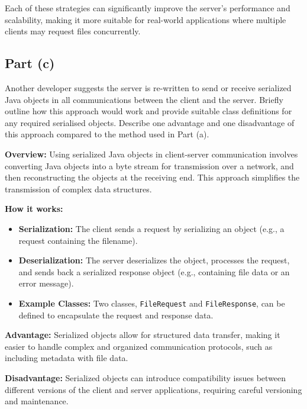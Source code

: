 \documentclass[12pt]{article}
\begin{document}
Each of these strategies can significantly improve the server's performance and scalability, making it more suitable for real-world applications where multiple clients may request files concurrently.

\vspace{1in} %

\subsection*{Part (c)} Another developer suggests the server is re-written to send or receive serialized
Java objects in all communications between the client and the server. Briefly
outline how this approach would work and provide suitable class definitions for
any required serialised objects. Describe one advantage and one disadvantage
of this approach compared to the method used in Part (a).

\vspace{0.1in} %

\textbf{Overview:} 
Using serialized Java objects in client-server communication involves converting Java objects into a byte stream for transmission over a network, and then reconstructing the objects at the receiving end. This approach simplifies the transmission of complex data structures.

\textbf{How it works:}
\begin{itemize}
    \item \textbf{Serialization:} The client sends a request by serializing an object (e.g., a request containing the filename).
    \item \textbf{Deserialization:} The server deserializes the object, processes the request, and sends back a serialized response object (e.g., containing file data or an error message).
    \item \textbf{Example Classes:} Two classes, \texttt{FileRequest} and \texttt{FileResponse}, can be defined to encapsulate the request and response data.
\end{itemize}

\textbf{Advantage:} 
Serialized objects allow for structured data transfer, making it easier to handle complex and organized communication protocols, such as including metadata with file data.

\textbf{Disadvantage:} 
Serialized objects can introduce compatibility issues between different versions of the client and server applications, requiring careful versioning and maintenance.
\end{document}
